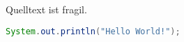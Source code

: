 \begin{frame}[fragile]{Quelltext ist fragil.}
  \begin{lstlisting}[gobble=2,language=Java]
    System.out.println("Hello World!");
  \end{lstlisting}
\end{frame}
